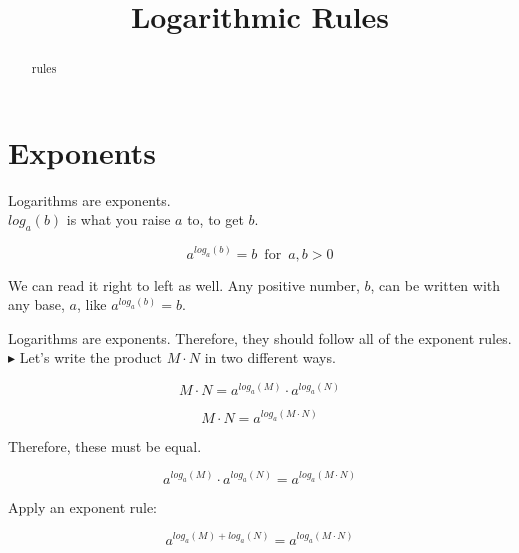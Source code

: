 \documentclass{ximera}
\title{Logarithmic Rules}
\begin{document}
\begin{abstract}
rules
\end{abstract}
\maketitle
































\section{Exponents}

Logarithms are exponents. \\


$log_a(b)$ is what you raise $a$ to, to get $b$.

\[    a^{log_a(b)}  = b    \, \text{ for } \,  a,b > 0     \]


We can read it right to left as well.  Any positive number, $b$, can be written with any base, $a$, like $a^{log_a(b)}  = b$.






Logarithms are exponents. Therefore, they should follow all of the exponent rules. \\



$\blacktriangleright$  Let's write the product $M \cdot N$ in two different ways.



\[   M \cdot N = a^{log_a(M)} \cdot a^{log_a(N)}                    \]

\[   M \cdot N = a^{log_a(M \cdot N)}                  \]


Therefore, these must be equal.


\[    a^{log_a(M)} \cdot a^{log_a(N)}     =   a^{log_a(M \cdot N)}                \]


Apply an exponent rule:


\[    a^{log_a(M)+log_a(N)}    =   a^{log_a(M \cdot N)}                \]
\end{document}
